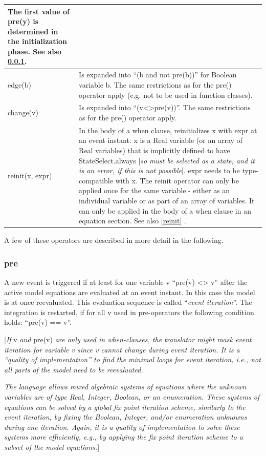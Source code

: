 \documentclass[10pt,a4paper]{report}
\def\doublelabel#1{\label{#1}\hypertarget{#1}{}}
\begin{document}
\begin{longtable}{|p{5cm}|p{8cm}|}
The first value of pre(y) is determined in the initialization phase. See
also \ref{pre}.\\ \hline
edge(b) & Is expanded into ``(b and not pre(b))'' for Boolean variable
b. The same restrictions as for the pre() operator apply (e.g. not to be
used in function classes).\\ \hline
change(v) & Is expanded into ``(v\textless{}\textgreater{}pre(v))''. The
same restrictions as for the pre() operator apply.\\ \hline
reinit(x, expr) & In the body of a when clause, reinitializes x with
expr at an event instant. x is a Real variable (or an array of Real
variables) that is implicitly defined to have StateSelect.always
{[}\emph{so} \emph{must be selected as a state, and it is an error, if
this is not possible}{]}. expr needs to be type-compatible with x. The
reinit operator can only be applied once for the same variable - either
as an individual variable or as part of an array of variables. It can
only be applied in the body of a when clause in an equation section. See
also \ref{reinit} .\\ \hline
\end{longtable}

A few of these operators are described in more detail in the following.

\subsubsection{pre}\doublelabel{pre}

A new event is triggered if at least for one variable v ``pre(v)
\textless{}\textgreater{} v'' after the active model equations are
evaluated at an event instant. In this case the model is at once
reevaluated. This evaluation sequence is called ``\emph{event
iteration}''. The integration is restarted, if for all v used in
pre-operators the following condition holds: ``pre(v) == v''.

{[}\emph{If} v \emph{and} pre(v) \emph{are only used in when-clauses,
the translator might mask event iteration for variable v since v cannot
change during event iteration. It is a ``quality of implementation'' to
find the minimal loops for event iteration, i.e., not all parts of the
model need to be reevaluated. }

\emph{The language allows mixed algebraic systems of equations where the
unknown variables are of type Real, Integer, Boolean, or an enumeration.
These systems of equations can be solved by a global fix point iteration
scheme, similarly to the event iteration, by fixing the Boolean,
Integer, and/or enumeration unknowns during one iteration. Again, it is
a quality of implementation to solve these systems more efficiently,
e.g., by applying the fix point iteration scheme to a subset of the
model equations.}{]}
\end{document}
